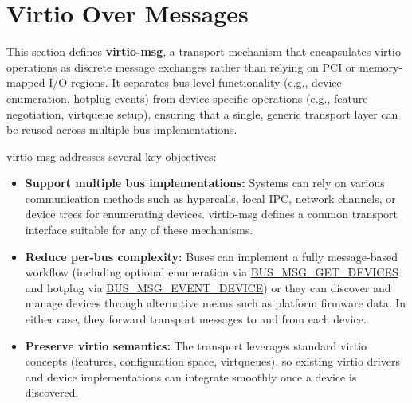 \section{Virtio Over Messages}\label{sec:Virtio Transport Options / Virtio Over Messages}

\newcommand{\conceptref}[1]{\hyperref[sec:Virtio Transport Options / Virtio Over Messages / Basic Concepts / #1]{#1}}
\newcommand{\msgref}[1]{\hyperref[sec:Virtio Transport Options / Virtio Over Messages / Transport Messages / VIRTIO_MSG_#1]{VIRTIO_MSG_#1}}
\newcommand{\busref}[1]{\hyperref[sec:Virtio Transport Options / Virtio Over Messages / Bus Messages / BUS_MSG_#1]{BUS_MSG_#1}}
\newcommand{\msgdef}[1]{\subsubsection{VIRTIO_MSG_#1}\label{sec:Virtio Transport Options / Virtio Over Messages / Transport Messages / VIRTIO_MSG_#1}}
\newcommand{\busdef}[1]{\subsubsection{BUS_MSG_#1}\label{sec:Virtio Transport Options / Virtio Over Messages / Bus Messages / BUS_MSG_#1}}

This section defines \textbf{virtio-msg}, a transport mechanism that encapsulates
virtio operations as discrete message exchanges rather than relying on PCI or
memory-mapped I/O regions. It separates bus-level functionality (e.g., device
enumeration, hotplug events) from device-specific operations (e.g., feature
negotiation, virtqueue setup), ensuring that a single, generic transport layer
can be reused across multiple bus implementations.

virtio-msg addresses several key objectives:

\begin{itemize}
  \item \textbf{Support multiple bus implementations:}
  Systems can rely on various communication methods such as hypercalls, local
  IPC, network channels, or device trees for enumerating devices. virtio-msg
  defines a common transport interface suitable for any of these mechanisms.

  \item \textbf{Reduce per-bus complexity:}
  Buses can implement a fully message-based workflow (including optional
  enumeration via \busref{GET_DEVICES} and hotplug via \busref{EVENT_DEVICE})
  or they can discover and manage devices through
  alternative means such as platform firmware data. In either case, they
  forward transport messages to and from each device.

  \item \textbf{Preserve virtio semantics:}
  The transport leverages standard virtio concepts (features, configuration
  space, virtqueues), so existing virtio drivers and device implementations can
  integrate smoothly once a device is discovered.
\end{itemize}

